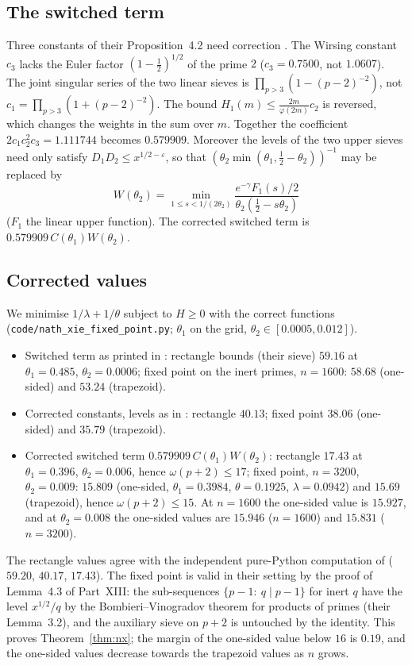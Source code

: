 \documentclass[11pt]{amsart}
\theoremstyle{remark}
\newcommand{\e}{\varepsilon}
\begin{document}
\subsection{The switched term}
Three constants of their Proposition~4.2 need correction \cite[\S5]{ChenNX}. The Wirsing constant $c_3$ lacks the Euler factor $(1-\frac12)^{1/2}$ of the prime $2$ ($c_3=0.7500$, not $1.0607$). The joint singular series of the two linear sieves is $\prod_{p>3}(1-(p-2)^{-2})$, not $c_1=\prod_{p>3}(1+(p-2)^{-2})$. The bound $H_1(m)\le\frac{2m}{\varphi(2m)}c_2$ is reversed, which changes the weights in the sum over $m$. Together the coefficient $2c_1c_2^2c_3=1.111744$ becomes $0.579909$. Moreover the levels of the two upper sieves need only satisfy $D_1D_2\le x^{1/2-\e}$, so that $(\theta_2\min(\theta_1,\frac12-\theta_2))^{-1}$ may be replaced by
\[
W(\theta_2)=\min_{1\le s<1/(2\theta_2)}\frac{e^{-\gamma}F_1(s)/2}{\theta_2(\frac12-s\theta_2)}
\]
($F_1$ the linear upper function). The corrected switched term is $0.579909\,C(\theta_1)W(\theta_2)$.

\subsection{Corrected values}
We minimise $1/\lambda+1/\theta$ subject to $H\ge0$ with the correct functions (\texttt{code/nath\_xie\_fixed\_point.py}; $\theta_1$ on the grid, $\theta_2\in[0.0005,0.012]$).
\begin{itemize}[leftmargin=1.5em]
\item Switched term as printed in \cite{NX}: rectangle bounds (their sieve) $59.16$ at $\theta_1=0.485$, $\theta_2=0.0006$; fixed point on the inert primes, $n=1600$: $58.68$ (one-sided) and $53.24$ (trapezoid).
\item Corrected constants, levels as in \cite{NX}: rectangle $40.13$; fixed point $38.06$ (one-sided) and $35.79$ (trapezoid).
\item Corrected switched term $0.579909\,C(\theta_1)W(\theta_2)$: rectangle $17.43$ at $\theta_1=0.396$, $\theta_2=0.006$, hence $\omega(p+2)\le17$; fixed point, $n=3200$, $\theta_2=0.009$: $15.809$ (one-sided, $\theta_1=0.3984$, $\theta=0.1925$, $\lambda=0.0942$) and $15.69$ (trapezoid), hence $\omega(p+2)\le15$. At $n=1600$ the one-sided value is $15.927$, and at $\theta_2=0.008$ the one-sided values are $15.946$ ($n=1600$) and $15.831$ ($n=3200$).
\end{itemize}
The rectangle values agree with the independent pure-Python computation of \cite{ChenNX} ($59.20$, $40.17$, $17.43$). The fixed point is valid in their setting by the proof of Lemma~4.3 of Part~XIII: the sub-sequences $\{p-1:\ q\mid p-1\}$ for inert $q$ have the level $x^{1/2}/q$ by the Bombieri--Vinogradov theorem for products of primes (their Lemma~3.2), and the auxiliary sieve on $p+2$ is untouched by the identity. This proves Theorem~\ref{thm:nx}; the margin of the one-sided value below $16$ is $0.19$, and the one-sided values decrease towards the trapezoid values as $n$ grows.
\end{document}
